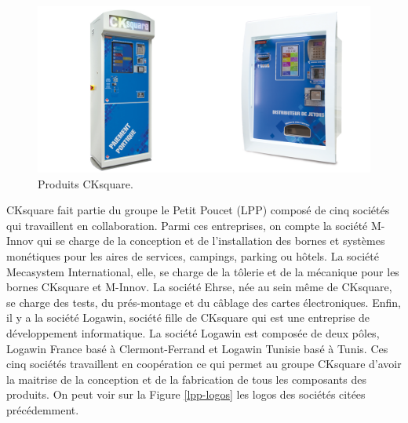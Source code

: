 \documentclass[a4paper]{article}
\begin{document}
\begin{figure}[h!]
  \begin{center}
  \includegraphics[scale=0.2]{./img/bornes.png}
  \caption{Produits CKsquare.}
    \label{bornes-intro}
  \end{center}
\end{figure}

CKsquare fait partie du groupe le Petit Poucet (LPP) composé de cinq sociétés
qui travaillent en collaboration. Parmi ces entreprises, on compte la société
M-Innov qui se charge de la conception et de l'installation des bornes et
systèmes monétiques pour les aires de services, campings, parking ou hôtels. La
société Mecasystem International, elle, se charge de la tôlerie et de la
mécanique pour les bornes CKsquare et M-Innov. La société Ehrse, née au sein
même de CKsquare, se charge des tests, du prés-montage et du câblage des cartes
électroniques. Enfin, il y a la société Logawin, société fille de CKsquare qui
est une entreprise de développement informatique. La société Logawin est
composée de deux pôles, Logawin France basé à Clermont-Ferrand et Logawin
Tunisie basé à Tunis. Ces cinq sociétés travaillent en coopération ce qui permet
au groupe CKsquare d'avoir la maitrise de la conception et de la fabrication de
tous les composants des produits. On peut voir sur la Figure \ref{lpp-logos} les
logos des sociétés citées précédemment.

\clearpage
\end{document}
